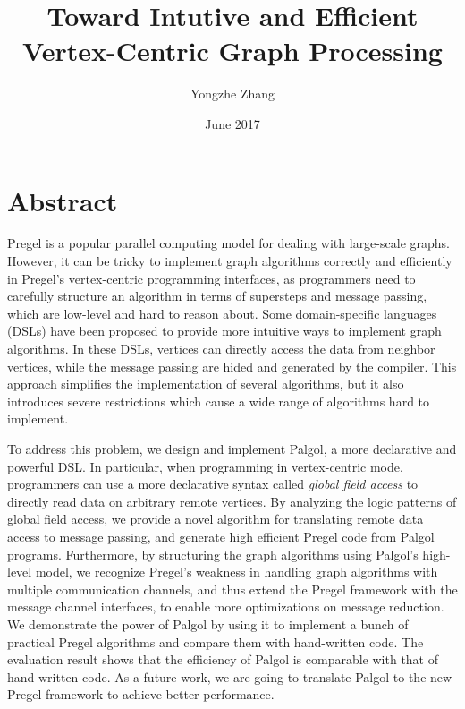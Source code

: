 \documentclass{sokendai_thesis} %
\title{Toward Intutive and Efficient Vertex-Centric Graph Processing}
\author{Yongzhe Zhang}
\date{June 2017}
\begin{document}
\frontmatter
\maketitle

\listoftodos

\chapter*{Abstract}

Pregel is a popular parallel computing model for dealing with large-scale graphs.
However, it can be tricky to implement graph algorithms correctly and efficiently in Pregel's vertex-centric programming interfaces, as programmers need to carefully structure an algorithm in terms of supersteps and message passing, which are low-level and hard to reason about.
Some domain-specific languages (DSLs) have been proposed to provide more intuitive ways to implement graph algorithms.
In these DSLs, vertices can directly access the data from neighbor vertices, while the message passing are hided and generated by the compiler.
This approach simplifies the implementation of several algorithms, but it also introduces severe restrictions which cause a wide range of algorithms hard to implement.

To address this problem, we design and implement Palgol, a more declarative and powerful DSL.
In particular, when programming in vertex-centric mode, programmers can use a more declarative syntax called \emph{global field access} to directly read data on arbitrary remote vertices.
By analyzing the logic patterns of global field access, we provide a novel algorithm for translating remote data access to message passing, and generate high efficient Pregel code from Palgol programs.
Furthermore, by structuring the graph algorithms using Palgol's high-level model, we recognize Pregel's weakness in handling graph algorithms with multiple communication channels, and thus extend the Pregel framework with the message channel interfaces, to enable more optimizations on message reduction.
We demonstrate the power of Palgol by using it to implement a bunch of practical Pregel algorithms and compare them with hand-written code.
The evaluation result shows that the efficiency of Palgol is comparable with that of hand-written code.
As a future work, we are going to translate Palgol to the new Pregel framework to achieve better performance.

\tableofcontents
\end{document}
